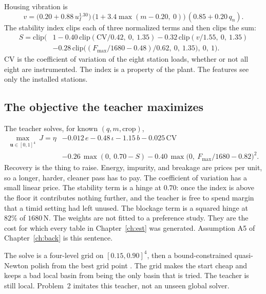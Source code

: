 Housing vibration is
\begin{equation}
v = \big(0.20 + 0.88\,u_I^{1.30}\big)\,
    \big(1+3.4\max(m-0.20,\ 0)\big)\,
    (0.85+0.20\,q_n).
\label{eq:vib}
\end{equation}
The stability index clips each of three normalized terms and then clips the sum:
\begin{equation}
\begin{aligned}
S = \mathrm{clip}\big(&1 - 0.40\,\mathrm{clip}(\mathrm{CV}/0.42,\ 0,\ 1.35)
 - 0.32\,\mathrm{clip}(v/1.55,\ 0,\ 1.35) \\
&- 0.28\,\mathrm{clip}\big((F_{\max}/1680-0.48)/0.62,\ 0,\ 1.35\big),\ 0,\ 1\big).
\end{aligned}
\label{eq:stab}
\end{equation}
\(\mathrm{CV}\) is the coefficient of variation of the eight station loads, whether or not all eight are instrumented. The index is a property of the plant. The features see only the installed stations.

\subsection{The objective the teacher maximizes}

The teacher solves, for known \((q,m,\text{crop})\),
\begin{equation}
\begin{aligned}
\max_{\mathbf{u}\in[0,1]^4}\ 
J = \eta &- 0.012\,e - 0.48\,\iota - 1.15\,b - 0.025\,\mathrm{CV} \\
&- 0.26\,\max(0,\ 0.70-S)
- 0.40\,\max\!\big(0,\ F_{\max}/1680-0.82\big)^2 .
\end{aligned}
\label{eq:J}
\end{equation}
Recovery is the thing to raise. Energy, impurity, and breakage are prices per unit, so a longer, harder, cleaner pass has to pay. The coefficient of variation has a small linear price. The stability term is a hinge at \(0.70\): once the index is above the floor it contributes nothing further, and the teacher is free to spend margin that a timid setting had left unused. The blockage term is a squared hinge at \(82\%\) of \(1680\,\mathrm{N}\). The weights are not fitted to a preference study. They are the cost for which every table in Chapter~\ref{ch:est} was generated. Assumption A5 of Chapter~\ref{ch:back} is this sentence.

The solve is a four-level grid on \([0.15,0.90]^4\), then a bound-constrained quasi-Newton polish from the best grid point \cite{nocedal2006}. The grid makes the start cheap and keeps a bad local basin from being the only basin that is tried. The teacher is still local. Problem~2 imitates this teacher, not an unseen global solver.

